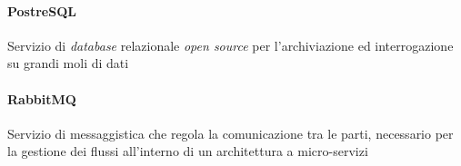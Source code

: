 \paragraph{PostreSQL} Servizio di \textit{database} relazionale \textit{open source} per l'archiviazione ed interrogazione su grandi moli di dati

\paragraph{RabbitMQ} Servizio di messaggistica che regola la comunicazione tra le parti, necessario per la gestione dei flussi all'interno di un architettura a micro-servizi

